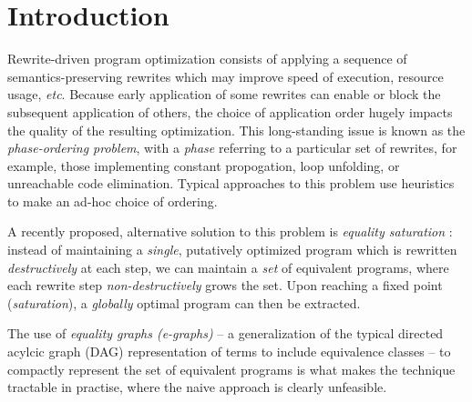 \newcommand\mylet[2]{\textsf{let } #1 = #2 \textsf{ in }}


\cite{heijltjes_functional_2023}
\cite{barrett_functional_2023}
\cite{griggio_proceedings_2022}
\cite{flatt_small_2022}
\cite{ghica_operational_2021}
\cite{ghica_hierarchical_2023}
\cite{ghica_rewriting_2023} %
\cite{wilson_string_2023} %

\cite{zhang_relational_2022} %
\cite{alvarez-picallo_rewriting_2022} %
\cite{alvarez-picallo_functorial_2021} %

\cite{bonchi_tape_nodate} %
\cite{baldan_categorical_2014} %
\cite{dpo}
\cite{maclane}
\cite{singher2023colored}



\section{Introduction}

Rewrite-driven program optimization consists of applying a sequence of semantics-preserving rewrites which may improve speed of execution, resource usage, \textit{etc}. Because early application of some rewrites can enable or block the subsequent application of others, the choice of application order hugely impacts the quality of the resulting optimization.  This long-standing issue is known as the \textit{phase-ordering problem}, with a \textit{phase} referring to a particular set of rewrites, for example,  those implementing constant propogation, loop unfolding, or unreachable code elimination. Typical approaches to this problem use heuristics to make an ad-hoc choice of ordering. 

A recently proposed,  alternative solution to this problem is \textit{equality saturation} 
\cite{10.1145/1594834.1480915}: instead of maintaining a \textit{single},  putatively optimized program which is rewritten \textit{destructively} at each step, we can maintain a \textit{set} of equivalent programs, where each rewrite step \textit{non-destructively} grows the set.  Upon reaching a fixed point (\textit{saturation}),  a \textit{globally} optimal program can then be extracted.%

The use of \textit{equality graphs (e-graphs)} \cite{EggPaper} -- a generalization of the typical directed acylcic graph (DAG) representation of terms to include equivalence classes -- to compactly represent the set of equivalent programs is what makes the technique tractable in practise, where the naive approach is clearly unfeasible. 

